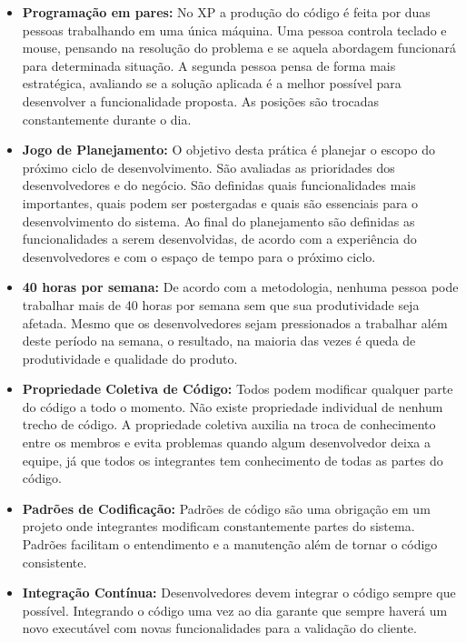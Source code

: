 \begin{itemize}
	\item \textbf{Programação em pares:} No XP a produção do código é feita por duas pessoas trabalhando em uma única máquina.  Uma pessoa controla  teclado e mouse, pensando na resolução do problema e se aquela abordagem funcionará para determinada situação. A segunda pessoa pensa de forma mais estratégica, avaliando se a solução aplicada é a melhor possível para desenvolver a funcionalidade proposta. As posições são trocadas constantemente durante o dia.

	\item \textbf{Jogo de Planejamento:} O objetivo desta prática é planejar o escopo do próximo ciclo de desenvolvimento. São avaliadas as prioridades dos desenvolvedores e do negócio. São definidas quais funcionalidades mais importantes, quais podem ser postergadas e quais são essenciais para o desenvolvimento do sistema. Ao final do planejamento são definidas as funcionalidades a serem desenvolvidas, de acordo com a experiência do desenvolvedores e com o espaço de tempo para o próximo ciclo.

	\item \textbf{40 horas por semana:} De acordo com a metodologia, nenhuma pessoa pode trabalhar mais de 40 horas por semana sem que sua produtividade seja afetada. Mesmo que os desenvolvedores sejam pressionados a trabalhar além deste período na semana, o resultado, na maioria das vezes é queda de produtividade e qualidade do produto.

	\item \textbf{Propriedade Coletiva de Código:} Todos podem modificar qualquer parte do código a todo o momento. Não existe propriedade individual de nenhum trecho de código. A propriedade coletiva auxilia na troca de conhecimento entre os membros e evita problemas quando algum desenvolvedor deixa a equipe, já que todos os integrantes tem conhecimento de todas as partes do código.

	\item \textbf{Padrões de Codificação:} Padrões de código são uma obrigação em um projeto onde integrantes modificam constantemente partes do sistema. Padrões facilitam o entendimento e a manutenção além de tornar o código consistente.

	\item \textbf{Integração Contínua:} Desenvolvedores devem integrar o código sempre que possível. Integrando o código uma vez ao dia garante que sempre haverá um novo executável com novas funcionalidades para a validação do cliente.

\end{itemize}

